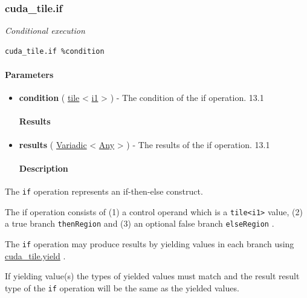 \documentclass{article}
\begin{document}
\subsubsection{cuda\_tile.if}

\textit{Conditional execution}


\begin{lstlisting}
cuda_tile.if %condition
\end{lstlisting}

\paragraph{Parameters}

\begin{itemize}
\item \textbf{condition} ( \href{https://docs.nvidia.com/cuda/tile-ir/latest/sections/types.html#type-tile}{tile} < \href{https://docs.nvidia.com/cuda/tile-ir/latest/sections/types.html#subsection-element-types}{i1} > ) - The condition of the if operation. 13.1


\paragraph{Results}

\item \textbf{results} ( \href{https://docs.nvidia.com/cuda/tile-ir/latest/sections/operations.html#type-variadic}{Variadic} < \href{https://docs.nvidia.com/cuda/tile-ir/latest/sections/operations.html#type-any}{Any} > ) - The results of the if operation. 13.1


\paragraph{Description}

\end{itemize}
The \texttt{if} operation represents an if-then-else construct.


The if operation consists of (1) a control operand which is a \texttt{tile<i1>} value, (2) a true branch \texttt{thenRegion} and (3) an optional false branch \texttt{elseRegion} .


The \texttt{if} operation may produce results by yielding values in each branch using \href{https://docs.nvidia.com/cuda/tile-ir/latest/sections/operations.html#op-cuda-tile-yield}{cuda\_tile.yield} .


If yielding value(s) the types of yielded values must match and the result result type of the \texttt{if} operation will be the same as the yielded values.
\end{document}
